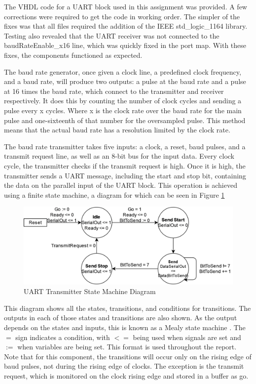\documentclass[11pt]{article}
\begin{document}
The VHDL code for a UART block used in this assignment was provided. 
A few corrections were required to get the code in working order. 
The simpler of the fixes was that all files required the addition of the IEEE std\_logic\_1164 library. 
Testing also revealed that the UART receiver was not connected to the baudRateEnable\_x16 line, which was quickly fixed in the port map.
With these fixes, the components functioned as expected.

The baud rate generator, once given a clock line, a predefined clock frequency, and a baud rate, will produce two outputs: a pulse at the baud rate and a pulse at 16 times the baud rate, which connect to the transmitter and receiver respectively.
It does this by counting the number of clock cycles and sending a pulse every x cycles.
Where x is the clock rate over the baud rate for the main pulse and one-sixteenth of that number for the oversampled pulse.
This method means that the actual baud rate has a resolution limited by the clock rate.

The baud rate transmitter takes five inputs: a clock, a reset, baud pulses, and a transmit request line, as well as an 8-bit bus for the input data.
Every clock cycle, the transmitter checks if the transmit request is high.
Once it is high, the transmitter sends a UART message, including the start and stop bit, containing the data on the parallel input of the UART block.
This operation is achieved using a finite state machine, a diagram for which can be seen in Figure \ref{fig:transmitsm}  

\begin{figure}[H]        
    \centering
    \includegraphics[width=.5\textwidth]{TransmitterSM.drawio.png}
    \caption{UART Transmitter State Machine Diagram}
    \label{fig:transmitsm}
\end{figure} 

This diagram shows all the states, transitions, and conditions for transitions.
The outputs in each of those states and transitions are also shown. 
As the output depends on the states and inputs, this is known as a Mealy state machine \cite{dally}.
The $=$ sign indicates a condition, with $<=$ being used when signals are set and $:=$ when variables are being set. 
This format is used throughout the report.
Note that for this component, the transitions will occur only on the rising edge of baud pulses, not during the rising edge of clocks. 
The exception is the transmit request, which is monitored on the clock rising edge and stored in a buffer as go.
\end{document}
